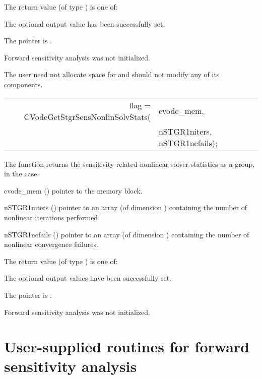 {
  The return value  (of type ) is one of:
  \begin{args}
  \item[\Id{CV\_SUCCESS}] 
    The optional output value has been successfully set.
  \item[\Id{CV\_MEM\_NULL}]
    The  pointer is .
  \item[\Id{CV\_NO\_SENS}]
    Forward sensitivity analysis was not initialized.
  \end{args}
}
{
  The user need not allocate space for  and should not modify
  any of its components.
}
{
  \begin{tabular}[t]{@{}r@{}l@{}}
    flag = CVodeGetStgrSensNonlinSolvStats(&cvode\_mem, \\
                                           &nSTGR1niters, nSTGR1ncfails);
  \end{tabular}
}
{
  The function  returns the sensitivity-related
  nonlinear solver statistics as a group, in the  case.
}
{
  \begin{args}
  \item[cvode\_mem] ()
    pointer to the {\cvodes} memory block.
  \item[nSTGR1niters] ()
    pointer to an array (of dimension ) containing the number of 
    nonlinear iterations performed.
  \item[nSTGR1ncfails] ()
    pointer to an array (of dimension ) containing the 
    number of nonlinear convergence failures.
  \end{args}
}
{
  The return value  (of type ) is one of:
  \begin{args}
  \item[\Id{CV\_SUCCESS}] 
    The optional output values have been successfully set.
  \item[\Id{CV\_MEM\_NULL}]
    The  pointer is .
  \item[\Id{CV\_NO\_SENS}]
    Forward sensitivity analysis was not initialized.
  \end{args}
}
{}
\section{User-supplied routines for forward sensitivity analysis}
\label{s:user_fct_fwd}

